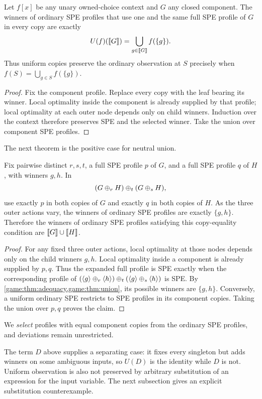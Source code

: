 \begin{proposition}\label{game:prop:uniform-observation}
Let $f[x]$ be any unary owned-choice context and $G$ any closed component.
The winners of ordinary SPE profiles that use one and the same full SPE
profile of $G$ in every copy are exactly
\[
 U(f)(\llbracket G\rrbracket)=\bigcup_{g\in\llbracket G\rrbracket}f(\{g\}).
\]
Thus uniform copies preserve the ordinary observation at $S$ precisely
when $f(S)=\bigcup_{g\in S}f(\{g\})$.
\end{proposition}
\begin{proof}
Fix the component profile. Replace every copy with the leaf bearing its
winner. Local optimality inside the component is already supplied by
that profile; local optimality at each outer node depends only on child
winners. Induction over the context therefore preserves SPE and the
selected winner. Take the union over component SPE profiles.
\end{proof}

The next theorem is the positive case for neutral union.

\begin{proposition}\label{game:thm:uniform}
Fix pairwise distinct $r,s,t$, a full SPE profile $p$ of $G$,
and a full SPE profile $q$ of $H$, with
winners $g,h$. In
\[
  (G\mathbin{\oplus_{r}} H)\mathbin{\oplus_{t}}(G\mathbin{\oplus_{s}} H),
\]
use exactly $p$ in both copies of $G$ and exactly $q$ in both copies of
$H$. As the three outer actions vary, the winners of ordinary SPE
profiles are exactly $\{g,h\}$. Therefore the winners of ordinary SPE
profiles satisfying this copy-equality condition are
$\llbracket G\rrbracket\cup\llbracket H\rrbracket$.
\end{proposition}
\begin{proof}
For any fixed three outer actions, local optimality at those nodes depends
only on the child winners $g,h$. Local optimality inside a component is
already supplied by $p,q$. Thus the expanded full profile is SPE exactly
when the corresponding profile of
$(\langle g\rangle\mathbin{\oplus_{r}}\langle h\rangle)\mathbin{\oplus_{t}}(\langle g\rangle\mathbin{\oplus_{s}}\langle h\rangle)$ is SPE. By
\cref{game:thm:adequacy,game:thm:union}, its possible winners are
$\{g,h\}$. Conversely, a uniform ordinary SPE restricts to SPE profiles
in its component copies. Taking the union over $p,q$ proves the claim.
\end{proof}

We \emph{select} profiles with equal component copies from the ordinary SPE
profiles, and deviations remain unrestricted.

The term $D$ above supplies a separating case: it fixes every singleton
but adds winners on some ambiguous inputs, so $U(D)$ is the identity
while $D$ is not. Uniform observation is also not preserved by arbitrary
substitution of an expression for the input variable. The next subsection gives an explicit substitution counterexample.

